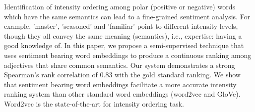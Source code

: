 Identification of intensity ordering among polar (positive or negative) words which have the same semantics can lead to a fine-grained sentiment analysis. For example, 'master', 'seasoned' and 'familiar' point to different intensity levels, though they all convey the same meaning (semantics), i.e., expertise: having a good knowledge of. In this paper, we propose a semi-supervised technique that uses sentiment bearing word embeddings to produce a continuous ranking among adjectives that share common semantics. Our system demonstrates a strong Spearman's rank correlation of 0.83 with the gold standard ranking. We show that sentiment bearing word embeddings facilitate a more accurate intensity ranking system than other standard word embeddings (word2vec and GloVe). Word2vec is the state-of-the-art for intensity ordering task.
